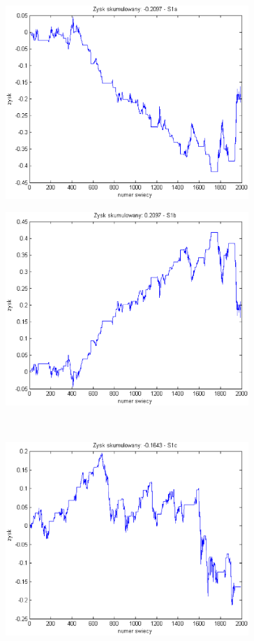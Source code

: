\documentclass{tewiart}
\begin{document}
\begin{figure}[h]
\centering
\begin{minipage}{.49\linewidth}
\centering
\includegraphics[width=0.82\textwidth]{images/fcopperS1a.eps}
\label{jedno}
\end{minipage}
\begin{minipage}{.49\linewidth}
\centering
\includegraphics[width=0.82\textwidth]{images/fcopperS1b.eps}
\label{dwu}
\end{minipage}
\\
\begin{minipage}{.49\linewidth}
\centering
\includegraphics[width=0.82\textwidth]{images/fcopperS1c.eps}

\end{minipage}
\end{figure}
\end{document}

